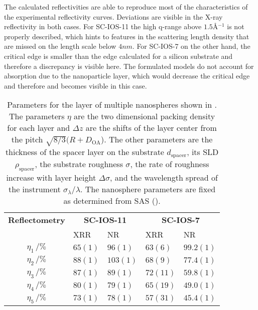 \documentclass[\main/dresen_thesis.tex]{subfiles}
\begin{document}
  The calculated reflectivities are able to reproduce most of the characteristics of the experimental reflectivity curves.
  Deviations are visible in the X-ray reflectivity in both cases.
  For SC-IOS-11 the high q-range above $1.5 \unit{\angstrom^{-1}}$ is not properly described, which hints to features in the scattering length density that are missed on the length scale below $4 \unit{nm}$.
  For SC-IOS-7 on the other hand, the critical edge is smaller than the edge calculated for a silicon substrate and therefore a discrepancy is visible here.
  The formulated models do not account for absorption due to the nanoparticle layer, which would decrease the critical edge and therefore and becomes visible in this case.

  \begin{table}[!htbp]
    \centering
    \caption{\label{tab:looselyPackedNP:layers:reflectivity}Parameters for the layer of multiple nanospheres shown in . The parameters $\eta$ are the two dimensional packing density for each layer and $\Delta z$ are the shifts of the layer center from the pitch $\sqrt{8/3} (R+D_\mathrm{OA}$). The other parameters are the thickness of the spacer layer on the substrate $d_\mathrm{spacer}$, its SLD $\rho_\mathrm{spacer}$, the substrate roughness $\sigma$, the rate of roughness increase with layer height $\Delta \sigma$, and the wavelength spread of the instrument $\sigma_\lambda / \lambda$. The nanosphere parameters are fixed as determined from SAS ().}
    \begin{tabular}{ c | l | l | l | l}
      \rule{0pt}{2ex} \textbf{Reflectometry}  & \multicolumn{2}{c}{\textbf{SC-IOS-11}} & \multicolumn{2}{c}{\textbf{SC-IOS-7}} \\
      \rule{0pt}{2ex}                   & XRR       & NR        & XRR       & NR \\
      \hline
       $\eta_1     \, / \unit{\%}$      & $65(1)$   & $96(1)$   & $63(6)$   & $99.2(1)$\\
       $\eta_2     \, / \unit{\%}$      & $88(1)$   & $103(1)$  & $68(9)$   & $77.4(1)$\\
       $\eta_3     \, / \unit{\%}$      & $87(1)$   & $89(1)$   & $72(11)$  & $59.8(1)$\\
       $\eta_4     \, / \unit{\%}$      & $80(1)$   & $79(1)$   & $65(19)$  & $49.0(1)$\\
       $\eta_5     \, / \unit{\%}$      & $73(1)$   & $78(1)$   & $57(31)$  & $45.4(1)$\\

\end{tabular}
\end{table}
\end{document}
